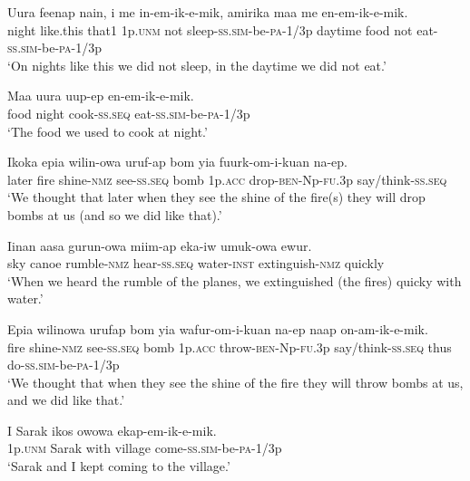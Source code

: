 {\ea\label{ex:a:x87}
\gll  Uura  feenap  nain,  i  me  in-em-ik-e-mik,  amirika maa  me  en-em-ik-e-mik. \\
night  like.this  that1  1p.\textsc{unm}  not  sleep-\textsc{ss}.\textsc{sim}-be-\textsc{pa}-1/3p  daytime   food  not  eat-\textsc{ss}.\textsc{sim}-be-\textsc{pa}-1/3p\\
\glt ‘On nights like this we did not sleep, in the daytime we did not eat.’ \\
\z


\ea\label{ex:a:x88}
\gll  Maa  uura  uup-ep  en-em-ik-e-mik. \\
food  night  cook-\textsc{ss.seq}  eat-\textsc{ss}.\textsc{sim}-be-\textsc{pa}-1/3p \\
\glt ‘The food we used to cook at night.’ \\
\z


\ea\label{ex:a:x89}
\gll  Ikoka  epia  wilin-owa  uruf-ap  bom  yia   fuurk-om-i-kuan  na-ep. \\
later  fire  shine-\textsc{nmz}  see-\textsc{ss.seq}  bomb  1p.\textsc{acc}  drop-\textsc{ben}-Np-\textsc{fu}.3p  say/think-\textsc{ss.seq} \\ 
\glt ‘We thought that later when they see the shine of the fire(s) they will drop bombs at us (and so we did like that).’ \\
\z


\ea\label{ex:a:x90}
\gll  Iinan  aasa  gurun-owa  miim-ap  eka-iw   umuk-owa  ewur. \\
sky  canoe  rumble-\textsc{nmz}  hear-\textsc{ss.seq}  water-\textsc{inst} extinguish-\textsc{nmz}  quickly \\


\glt ‘When we heard the rumble of the planes, we extinguished (the fires) quicky with water.’ \\
\z


\ea\label{ex:a:x91}
\gll  Epia  wilinowa  urufap  bom  yia  wafur-om-i-kuan        na-ep  naap  on-am-ik-e-mik. \\
fire  shine-\textsc{nmz}  see-\textsc{ss.seq}  bomb  1p.\textsc{acc}  throw-\textsc{ben}-Np-\textsc{fu}.3p  say/think-\textsc{ss.seq}  thus  do{}-\textsc{ss}.\textsc{sim}-be-\textsc{pa}-1/3p \\
\glt ‘We thought that when they see the shine of the fire they will throw bombs at us, and we did like that.’ \\
\z


\ea\label{ex:a:x92}
\gll  I  Sarak  ikos  owowa  ekap-em-ik-e-mik. \\
1p.\textsc{unm}  Sarak  with  village  come-\textsc{ss}.\textsc{sim}-be-\textsc{pa}-1/3p \\
\glt ‘Sarak and I kept coming to the village.’ \\
\z


}
